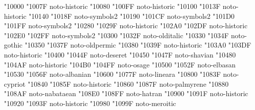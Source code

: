 \documentclass{article}
\begin{document}
                             { "10000} { "1007F} {noto-historic}
                             { "10080} { "100FF} {noto-historic}
                                 { "10100} { "1013F} {noto-historic}
                          { "10140} { "1018F} {noto-symbols2}
                                { "10190} { "101CF} {noto-symbols2}
                                  { "101D0} { "101FF} {noto-symbols2}
                                         { "10280} { "1029F} {noto-historic}
                                         { "102A0} { "102DF} {noto-historic}
                           { "102E0} { "102FF} {noto-symbols2}
                                     { "10300} { "1032F} {noto-olditalic}
                                         { "10330} { "1034F} {noto-gothic}
                                     { "10350} { "1037F} {noto-oldpermic}
                                       { "10380} { "1039F} {noto-historic}
                                    { "103A0} { "103DF} {noto-historic}
                                        { "10400} { "1044F} {noto-deseret}
                                        { "10450} { "1047F} {noto-shavian}
                                        { "10480} { "104AF} {noto-historic}
                                          { "104B0} { "104FF} {noto-osage}
                                        { "10500} { "1052F} {noto-elbasan}
                             { "10530} { "1056F} {noto-albanian}
                                       { "10600} { "1077F} {noto-lineara}
                              { "10800} { "1083F} {noto-cypriot}
                               { "10840} { "1085F} {noto-historic}
                                      { "10860} { "1087F} {noto-palmyrene}
                                      { "10880} { "108AF} {noto-nabataean}
                                         { "108E0} { "108FF} {noto-hatran}
                                     { "10900} { "1091F} {noto-historic}
                                         { "10920} { "1093F} {noto-historic}
                           { "10980} { "1099F} {noto-meroitic}
\end{document}
